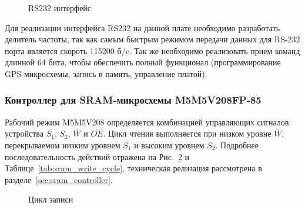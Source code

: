 \begin{figure}[H]
\caption{RS232 интерфейс}
\label{pic:rs232_wire}
\end{figure}

Для реализации интерфейса RS232 на данной плате необходимо разработать делитель частоты, так как самым быстрым режимом передачи данных
для RS-232 порта является скороть 115200 б/c. Так же необходимо реализовать прием команд длинной 64 бита, чтобы обеспечить
полный функционал (программирование GPS-микросхемы, запись в память, управление платой).

\subsubsection*{Контроллер для SRAM-микросхемы M5M5V208FP-85}
\label{sec:sram_controller}
Рабочий режим M5M5V208 определяется комбинацией управляющих сигналов устройства $\bar{S_1}$, ${S_2}$, $\bar{W}$ и $\bar{OE}$.
Цикл чтения выполняется при низком уровне $\bar{W}$, перекрываемом низким уровнем $\bar{S_1}$ и высоким уровнем ${S_2}$.
Подробнее последовательность действий отражена на Рис.~\ref{pic:sram_write_cycle} и Таблице~\ref{tab:sram_write_cycle},
техническая релизация рассмотрена в разделе~\ref{sec:sram_controller}.

\begin{figure}[H]
\caption{Цикл записи}
\label{pic:sram_write_cycle}
\end{figure}

